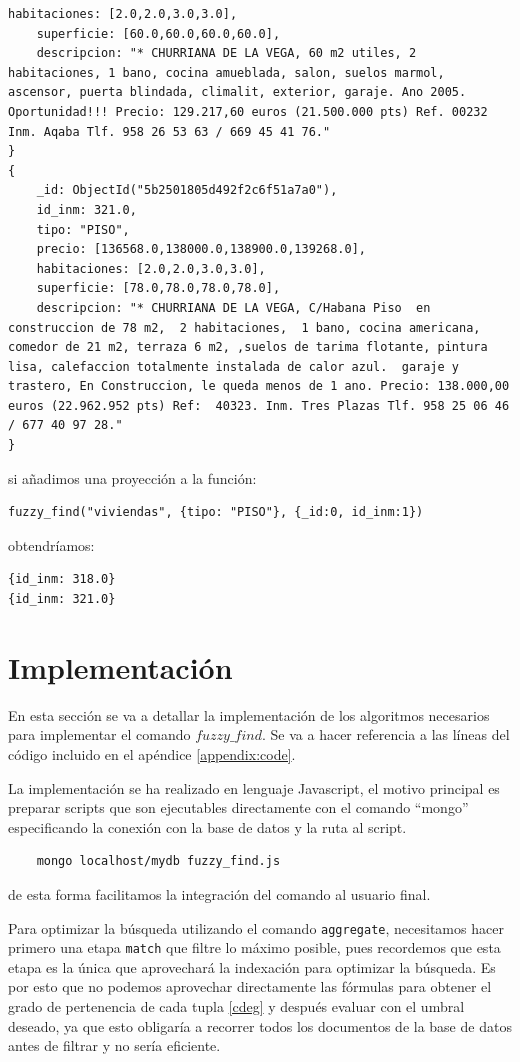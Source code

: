\begin{example}
\begin{lstlisting}[numbers=none]
    habitaciones: [2.0,2.0,3.0,3.0],
    superficie: [60.0,60.0,60.0,60.0],
    descripcion: "* CHURRIANA DE LA VEGA, 60 m2 utiles, 2 habitaciones, 1 bano, cocina amueblada, salon, suelos marmol, ascensor, puerta blindada, climalit, exterior, garaje. Ano 2005. Oportunidad!!! Precio: 129.217,60 euros (21.500.000 pts) Ref. 00232 Inm. Aqaba Tlf. 958 26 53 63 / 669 45 41 76."
}
{
    _id: ObjectId("5b2501805d492f2c6f51a7a0"),
    id_inm: 321.0,
    tipo: "PISO",
    precio: [136568.0,138000.0,138900.0,139268.0],
    habitaciones: [2.0,2.0,3.0,3.0],
    superficie: [78.0,78.0,78.0,78.0],
    descripcion: "* CHURRIANA DE LA VEGA, C/Habana Piso  en construccion de 78 m2,  2 habitaciones,  1 bano, cocina americana, comedor de 21 m2, terraza 6 m2, ,suelos de tarima flotante, pintura lisa, calefaccion totalmente instalada de calor azul.  garaje y trastero, En Construccion, le queda menos de 1 ano. Precio: 138.000,00 euros (22.962.952 pts) Ref:  40323. Inm. Tres Plazas Tlf. 958 25 06 46 / 677 40 97 28."
}
\end{lstlisting}
%
si añadimos una proyección a la función:
%
\begin{verbatim}
fuzzy_find("viviendas", {tipo: "PISO"}, {_id:0, id_inm:1})
\end{verbatim}
%
obtendríamos:
%
\begin{lstlisting}[numbers=none]
{id_inm: 318.0}
{id_inm: 321.0}
\end{lstlisting}

\end{example}

\section{Implementación}

En esta sección se va a detallar la implementación de los algoritmos necesarios para implementar el comando $fuzzy\_find$. Se va a hacer referencia a las líneas del código incluido en el apéndice \ref{appendix:code}.

La implementación se ha realizado en lenguaje Javascript, el motivo principal es preparar scripts que son ejecutables directamente con el comando ``mongo'' especificando la conexión con la base de datos y la ruta al script.
%
\begin{verbatim}
    mongo localhost/mydb fuzzy_find.js
\end{verbatim}
%
de esta forma facilitamos la integración del comando al usuario final.

Para optimizar la búsqueda utilizando el comando \texttt{aggregate}, necesitamos hacer primero una etapa \texttt{match} que filtre lo máximo posible, pues recordemos que esta etapa es la única que aprovechará la indexación para optimizar la búsqueda. Es por esto que no podemos aprovechar directamente las fórmulas para obtener el grado de pertenencia de cada tupla \ref{cdeg} y después evaluar con el umbral deseado, ya que esto obligaría a recorrer todos los documentos de la base de datos antes de filtrar y no sería eficiente.

